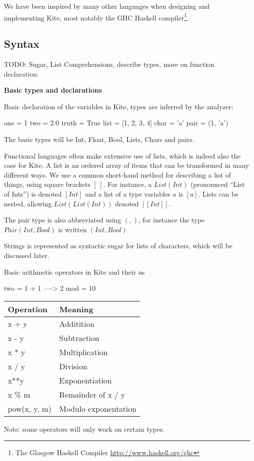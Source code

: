 We have been inspired by many other languages when designing and
implementing Kite, most notably the GHC Haskell compiler\footnote{The
  Glasgow Haskell Compiler \url{http://www.haskell.org/ghc}}.

\subsection{Syntax}

TODO: Sugar, List Comprehensions, describe types, more on function declaration.

\textbf{Basic types and declarations}

Basic declaration of the variables in Kite, types are inferred by the analyzer:
\begin{kite}
  
  one = 1
  two = 2.0
  truth = True
  list = [1, 2, 3, 4]
  char = 'a' 
  pair = (1, 'a')
\end{kite}

The basic types will be Int, Float, Bool, Lists, Chars and
pairs.

Functional languages often make extensive use of lists, which is
indeed also the case for Kite. A list is an ordered array of items
that can be transformed in many different ways. We use a common
short-hand method for describing a list of things, using square
brackets $[\ ]$. For instance, a $List(Int)$ (pronounced ``List of
Ints'') is denoted $[Int]$ and a list of a type variables $a$ is
$[a]$. Lists can be nested, allowing $List(List(Int))$ denoted
$[[Int]]$.

The pair type is also abbreviated using $(,)$, for instance the type
$Pair(Int, Bool)$ is written $(Int, Bool)$

Strings is represented as syntactic sugar for lists of characters,
which will be discussed later.

Basic arithmetic operators in Kite and their us
\begin{kite}

  two = 1 + 1  ---->  2
  mod = 10 %
\end{kite}

\begin{table}[H]
\centering
    \begin{tabular}{|l|l|}
    \hline
    Operation    & Meaning              \\ \hline
    x + y        & Additition           \\ \hline
    x - y        & Subtraction          \\ \hline
    x * y        & Multiplication       \\ \hline
    x / y        & Division             \\ \hline
    x**y         & Exponentiation       \\ \hline
    x \% m       & Remainder of x / y   \\ \hline
    pow(x, y, m) & Modulo exponentation \\ \hline
    \end{tabular}
\end{table}
Note: some operators will only work on certain types.

